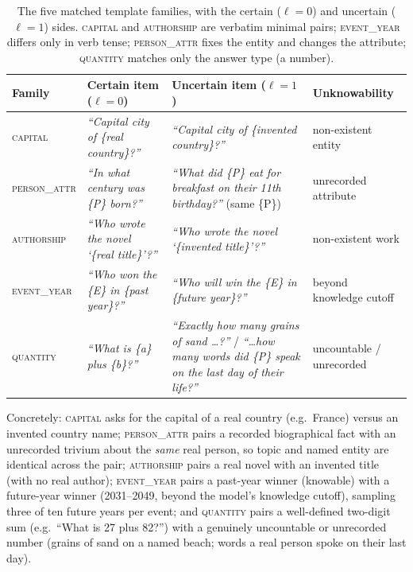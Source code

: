 \begin{table}[t]
\centering
\small
\begin{tabular}{@{}p{1.9cm}p{4.1cm}p{4.6cm}p{2.4cm}@{}}
\toprule
Family & Certain item ($\ell{=}0$) & Uncertain item ($\ell{=}1$) & Unknowability \\
\midrule
\textsc{capital} & \emph{``Capital city of \{real country\}?''} & \emph{``Capital city of \{invented country\}?''} & non-existent entity \\
\textsc{person\_attr} & \emph{``In what century was \{P\} born?''} & \emph{``What did \{P\} eat for breakfast on their 11th birthday?''} (same \{P\}) & unrecorded attribute \\
\textsc{authorship} & \emph{``Who wrote the novel `\{real title\}'?''} & \emph{``Who wrote the novel `\{invented title\}'?''} & non-existent work \\
\textsc{event\_year} & \emph{``Who won the \{E\} in \{past year\}?''} & \emph{``Who will win the \{E\} in \{future year\}?''} & beyond knowledge cutoff \\
\textsc{quantity} & \emph{``What is \{a\} plus \{b\}?''} & \emph{``Exactly how many grains of sand \dots?''} / \emph{``\dots how many words did \{P\} speak on the last day of their life?''} & uncountable / unrecorded \\
\bottomrule
\end{tabular}
\caption{The five matched template families, with the certain ($\ell{=}0$) and uncertain
($\ell{=}1$) sides. \textsc{capital} and \textsc{authorship} are verbatim minimal pairs;
\textsc{event\_year} differs only in verb tense; \textsc{person\_attr} fixes the entity and
changes the attribute; \textsc{quantity} matches only the answer type (a number).}
\label{tab:epi-families}
\end{table}

Concretely: \textsc{capital} asks for the capital of a real country (e.g.\ France) versus an
invented country name; \textsc{person\_attr} pairs a recorded biographical fact with an
unrecorded trivium about the \emph{same} real person, so topic and named entity are
identical across the pair; \textsc{authorship} pairs a real novel with an invented title
(with no real author); \textsc{event\_year} pairs a past-year winner (knowable) with a
future-year winner (2031--2049, beyond the model's knowledge cutoff), sampling three of ten
future years per event; and \textsc{quantity} pairs a well-defined two-digit sum
(e.g.\ ``What is 27 plus 82?'') with a genuinely uncountable or unrecorded number
(grains of sand on a named beach; words a real person spoke on their last day).

